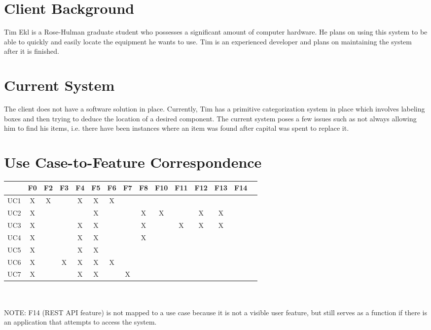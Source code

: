 \documentclass{article}
\begin{document}
\section{Client Background}
Tim Ekl is a Rose-Hulman graduate student who possesses a significant amount of computer hardware.  He plans on using this system to be able to quickly and easily locate the equipment he wants to use.  Tim is an experienced developer and plans on maintaining the system after it is finished.  

\section{Current System}
The client does not have a software solution in place.  Currently, Tim has a primitive categorization system in place which involves labeling boxes and then trying to deduce the location of a desired component.  The current system poses a few issues such as not always allowing him to find his items, i.e. there have been instances where an item was found after capital was spent to replace it.

\section{Use Case-to-Feature Correspondence}
\begin{tabular}{ | c || c | c | c | c | c | c | c | c | c | c | c | c | c | c | }
\hline
    & F0 & F2 & F3 & F4 & F5 & F6 & F7 & F8 & F10 & F11 & F12 & F13 & F14 \\
\hline
\hline
UC1  &  X &  X &    &  X &  X &  X &    &    &    &    &    &    &    \\
\hline
UC2  &  X &    &    &    &  X &    &    &  X &  X &    &  X &  X &    \\
\hline
UC3  &  X &    &    &  X &  X &    &    &  X &    &  X &  X &  X &    \\
\hline
UC4  &  X &    &    &  X &  X &    &    &  X &    &    &    &    &    \\
\hline
UC5  &  X &    &    &  X &  X &    &    &    &    &    &    &    &    \\
\hline
UC6  &  X &    &  X &  X &  X &  X &    &    &    &    &    &    &    \\
\hline
UC7  &  X &    &    &  X &  X &    &  X &    &    &    &    &    &    \\
\hline
\end{tabular}\\ \\
NOTE: F14 (REST API feature) is not mapped to a use case because it is not a visible user feature, but still serves as a function if there is an application that attempts to access the system.
\end{document}
